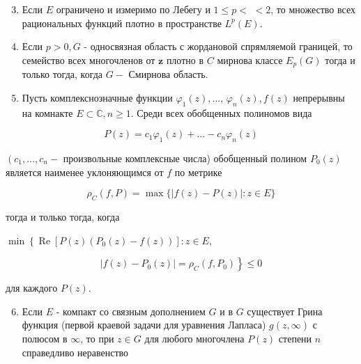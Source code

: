 \documentclass[10pt]{article}
\begin{document}
\begin{enumerate}

  \setcounter{enumi}{2}

  \item Если $E$ ограничено и измеримо по Лебегу и $1 \leqslant p<$ $<2$, то множество всех рациональных функций плотно в пространстве $L^{p}(E)$.



  \item Если $p>0, G$ - односвязная область с жордановой спрямляемой границей, то семейство всех многочленов от $\boldsymbol{z}$ плотно в $C$ мирнова классе $E_{p}(G)$ тогда и только тогда, когда $G-$ Смирнова область.



  \item Пусть комплекснозначные функции $\varphi_{1}(z), \ldots$, $\varphi_{n}(z), f(z)$ непрерывны на комнакте $E \subset \mathbb{C}, n \geqslant 1$. Среди всех обобщенных полиномов вида



\end{enumerate}



\[

P(z)=c_{1} \varphi_{1}(z)+\ldots-c_{n} \varphi_{n}(z)

\]



$\left(c_{1}, \ldots, c_{n}-\right.$ произвольные комплексные числа) обобщенный полином $P_{0}(z)$ является наименее уклоняющимся от $f$ по метрике



\[

\rho_{C}(f, P)=\max \{|f(z)-P(z)|: z \in E\}

\]



тогда и только тогда, когда



$\min \left\{\operatorname{Re}\left[P(z)\left(P_{0}(z)-f(z)\right)\right]: z \in E\right.$,



\[

\left.\left|f(z)-P_{0}(z)\right|=\rho_{C}\left(f, P_{0}\right)\right\} \leqslant 0

\]



для каждого $P(z)$.



\begin{enumerate}

  \setcounter{enumi}{5}

  \item Если $E$ - компакт со связным дополнением $G$ и в $G$ существует Грина функция (первой краевой задачи для уравнения Лапласа) $g(z, \infty)$ с полюсом в $\infty$, то при $z \in G$ для любого многочлена $P(z)$ степени $n$ справедливо неравенство

\end{enumerate}
\end{document}
